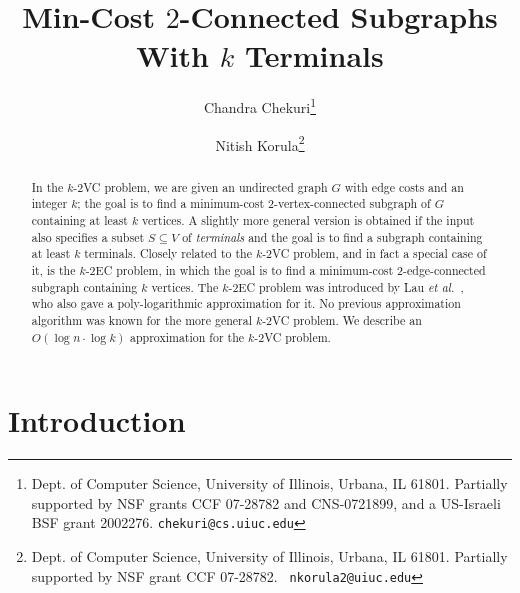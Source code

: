 \documentclass[11pt]{article}
\newcommand{\etal}{{\em et al.}\ }
\newcommand{\kec}[1]{$k$-$#1${\sc EC} }
\newcommand{\kvc}[1]{$k$-$#1${\sc VC} }
\newcommand{\ke}{\kec{2}}
\newcommand{\kv}{\kvc{2}}
\begin{document}
\title{Min-Cost $2$-Connected Subgraphs With $k$ Terminals}
\author{
  Chandra Chekuri\thanks{Dept. of Computer Science, University of Illinois, Urbana,
    IL 61801. Partially supported by NSF grants CCF 07-28782 and CNS-0721899, and a
    US-Israeli BSF grant 2002276. {\tt chekuri@cs.uiuc.edu}}
  \and 
  Nitish Korula\thanks{Dept. of Computer Science, University of Illinois, Urbana,
    IL 61801.  Partially supported by NSF grant CCF 07-28782. {\tt
      nkorula2@uiuc.edu}} }
\date{}
\maketitle

\begin{abstract}
  In the \kv problem, we are given an undirected graph $G$ with edge
  costs and an integer $k$; the goal is to find a minimum-cost
  2-vertex-connected subgraph of $G$ containing at least $k$
  vertices. A slightly more general version is obtained if the
  input also specifies a subset $S \subseteq V$ of {\em terminals} and
  the goal is to find a subgraph containing at least $k$ terminals.
  Closely related to the \kv problem, and in fact a special case of
  it, is the \ke problem, in which the goal is to find a minimum-cost
  2-edge-connected subgraph containing $k$ vertices. The \ke problem
  was introduced by Lau \etal \cite{LauNSS07}, who also gave a
  poly-logarithmic approximation for it. No previous approximation
  algorithm was known for the more general \kv problem.  We describe
  an $O(\log n \cdot \log k)$ approximation for the \kv problem.
\end{abstract}

\section{Introduction}
\label{sec:intro}
\end{document}
